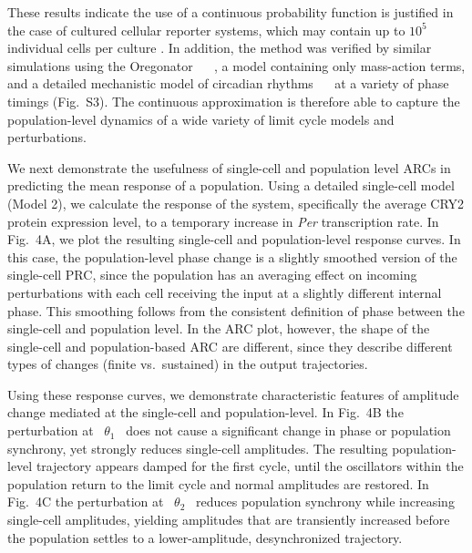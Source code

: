 \documentclass[11pt, letterpaper]{article}
\providecommand{\DIFadd}[1]{{\protect\color{blue}#1}} %
\providecommand{\DIFaddbegin}{} %
\providecommand{\DIFaddend}{} %
\begin{document}
These results indicate the use of a continuous probability function is justified in the case of \DIFaddbegin \DIFadd{cultured cellular reporter }\DIFaddend systems, which may contain up to $10^5$ individual cells per culture \cite{Welsh2004}.
\DIFaddbegin \DIFadd{In addition, the method was verified by similar simulations using the Oregonator \mbox{%
\cite{Field1974}
}%
, a model containing only mass-action terms, and a detailed mechanistic model of circadian rhythms \mbox{%
\cite{Hirota2012}
}%
at a variety of phase timings (Fig.~S3).
The continuous approximation is therefore able to capture the population-level dynamics of a wide variety of limit cycle models and perturbations.
}

\DIFadd{We next demonstrate the usefulness of single-cell and population level ARCs in predicting the mean response of a population.
Using a detailed single-cell model (Model 2), we calculate the response of the system, specifically the average CRY2 protein expression level, to a temporary increase in }{\itshape \DIFadd{Per}} \DIFadd{transcription rate.
In Fig.~4A, we plot the resulting single-cell and population-level response curves.
In this case, the population-level phase change is a slightly smoothed version of the single-cell PRC, since the population has an averaging effect on incoming perturbations with each cell receiving the input at a slightly different internal phase.
This smoothing follows from the consistent definition of phase between the single-cell and population level.
In the ARC plot, however, the shape of the single-cell and population-based ARC are different, since they describe different types of changes (finite vs.}\ \DIFadd{sustained) in the output trajectories.
}

\DIFadd{Using these response curves, we demonstrate characteristic features of amplitude change mediated at the single-cell and population-level.
In Fig.~4B the perturbation at \mbox{%
$\theta_1$
}%
does not cause a significant change in phase or population synchrony, yet strongly reduces single-cell amplitudes.
The resulting population-level trajectory appears damped for the first cycle, until the oscillators within the population return to the limit cycle and normal amplitudes are restored.
In Fig.~4C the perturbation at \mbox{%
$\theta_2$
}%
reduces population synchrony while increasing single-cell amplitudes, yielding amplitudes that are transiently increased before the population settles to a lower-amplitude, desynchronized trajectory.
}
\end{document}
